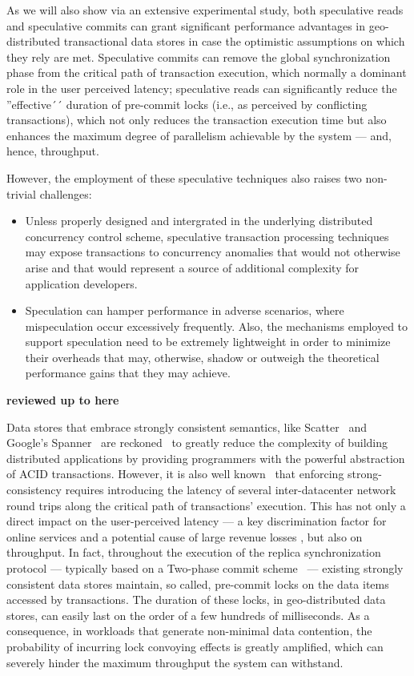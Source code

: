 As we will also show via an extensive experimental study, both speculative reads and speculative commits can grant significant performance advantages in geo-distributed transactional data stores in case the optimistic assumptions on which they rely are met. Speculative commits can remove the global synchronization phase from the critical path of transaction execution, which normally a dominant role in the user perceived latency; 
 speculative reads can significantly reduce the ''effective´´ duration of pre-commit locks (i.e., as perceived by conflicting transactions), which not only reduces the transaction execution time but also enhances the maximum degree of parallelism achievable by the system --- and, hence, throughput.

However, the employment of these speculative techniques also raises two non-trivial challenges:
\begin{itemize}
\item Unless properly designed and intergrated in the underlying distributed concurrency control scheme, speculative transaction processing techniques may expose transactions to concurrency anomalies that would not otherwise arise and that would represent a source of additional complexity for application developers.
\item Speculation can hamper performance in adverse scenarios, where mispeculation occur excessively frequently. Also, the mechanisms employed to support speculation need to be extremely lightweight in order to minimize their overheads that may, otherwise, shadow or outweigh the theoretical performance gains that they may achieve.
\end{itemize}

{\bf reviewed up to here}

Data stores that embrace strongly consistent semantics, like Scatter~\cite{scatter} and Google's Spanner~\cite{spanner} are reckoned~\cite{shute2012f1} to greatly reduce the complexity of building distributed applications by providing programmers with the powerful abstraction of ACID transactions. However, it is also well known~\cite{brewer2012cap}  that enforcing strong-consistency requires introducing the latency of several inter-datacenter network round trips along the critical path of transactions' execution. This has not only a direct impact on the user-perceived latency --- a key discrimination factor for online services and a potential cause of large revenue losses  \cite{schurman2009user}, but also on throughput. In fact, throughout the execution of the replica synchronization protocol --- typically based on a Two-phase commit scheme~\cite{spanner,peluso2012score} --- existing strongly consistent data stores maintain, so called, pre-commit locks on the data items accessed by transactions. The duration of these locks, in geo-distributed data stores, can easily last on the order of a few hundreds of milliseconds. As a consequence, in workloads that generate non-minimal data contention, the probability of incurring lock convoying effects is greatly amplified, which can severely hinder the maximum throughput the system can withstand.

